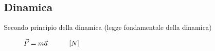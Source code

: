 \documentclass[a4paper,11pt,italian]{article}
\begin{document}
\subsection{Dinamica}
\begin{description}
%   
%   
%   
%   
%   
  \item[Secondo principio della dinamica (legge fondamentale della dinamica)] 
  $ \vec{F} = m  \vec{a}   \hspace*{3em} \left[ N \right]  $
  

\end{description}
\end{document}
